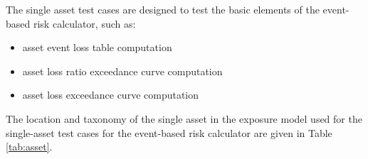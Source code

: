 The single asset test cases are designed to test the basic elements of the event-based risk calculator, such as:

\begin{itemize}
\item asset event loss table computation
\item asset loss ratio exceedance curve computation
\item asset loss exceedance curve computation
\end{itemize}

The location and taxonomy of the single asset in the exposure model used for the single-asset test cases for the event-based risk calculator are given in Table \ref{tab:asset}.